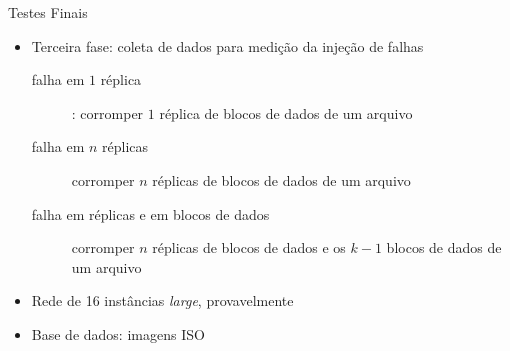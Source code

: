   \begin{frame}{Testes Finais}
     \begin{itemize}
        \item<1-> Terceira fase: coleta de dados para medição da injeção de falhas
           \begin{description}
              \item [falha em $1$ réplica]: corromper $1$ réplica de blocos de dados de um arquivo
              \item [falha em $n$ réplicas] corromper $n$ réplicas de blocos de dados de um arquivo
              \item [falha em réplicas e em blocos de dados] corromper $n$ réplicas de blocos de dados e os $k-1$ blocos de dados de um arquivo
            \end{description}
        \item<2-> Rede de 16 instâncias \emph{large}, provavelmente
        \item<3-> Base de dados: imagens ISO
     \end{itemize}
  \end{frame}
